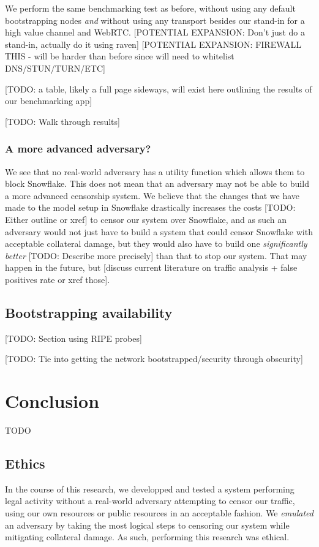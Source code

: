 \documentclass[12pt]{report}
\begin{document}
We perform the same benchmarking test as before, without using any default bootstrapping nodes \emph{and} without using any transport besides our stand-in for a high value channel and WebRTC. [POTENTIAL EXPANSION: Don't just do a stand-in, actually do it using raven] [POTENTIAL EXPANSION: FIREWALL THIS - will be harder than before since will need to whitelist DNS/STUN/TURN/ETC]

[TODO: a table, likely a full page sideways, will exist here outlining the results of our benchmarking app]

[TODO: Walk through results]

\subsection{A more advanced adversary?}

We see that no real-world adversary has a utility function which allows them to block Snowflake. This does not mean that an adversary may not be able to build a more advanced censorship system. We believe that the changes that we have made to the model setup in Snowflake drastically increases the costs [TODO: Either outline or xref] to censor our system over Snowflake, and as such an adversary would not just have to build a system that could censor Snowflake with acceptable collateral damage, but they would also have to build one \emph{significantly better} [TODO: Describe more precisely] than that to stop our system. That may happen in the future, but [discuss current literature on traffic analysis + false positives rate or xref those].

\section{Bootstrapping availability}

[TODO: Section using RIPE probes]

[TODO: Tie into getting the network bootstrapped/security through obscurity]

\chapter{Conclusion}

TODO

\section{Ethics}

In the course of this research, we developped and tested a system performing legal activity without a real-world adversary attempting to censor our traffic, using our own resources or public resources in an acceptable fashion. We \emph{emulated} an adversary by taking the most logical steps to censoring our system while mitigating collateral damage. As such, performing this research was ethical.
\end{document}
